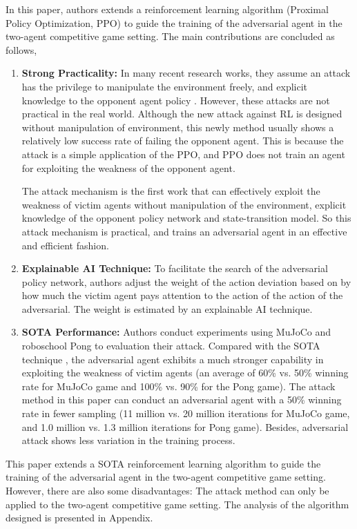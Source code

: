 \documentclass[a4paper]{article}
\begin{document}
In this paper, authors extends a reinforcement learning algorithm (Proximal Policy Optimization, PPO) to guide the training of the adversarial agent in the two-agent competitive game setting.
The main contributions are concluded as follows,
\begin{enumerate}
    \item \textbf{Strong Practicality:} In many recent research works, they assume an attack has the privilege to manipulate the environment freely, and explicit knowledge to the opponent agent policy \cite{xiao2019characterizing}. 
    However, these attacks are not practical in the real world. Although the new attack against RL is designed without manipulation of environment\cite{vinyals2019grandmaster}, 
    this newly method usually shows a relatively low success rate of failing the opponent agent. This is because the attack is a simple application of the PPO, and PPO does not train an agent for exploiting the weakness of the opponent agent.
    
    The attack mechanism is the first work that can effectively exploit the weakness of victim agents without manipulation of the environment, explicit knowledge of the opponent policy network and state-transition model.
    So this attack mechanism is practical, and trains an adversarial agent in an effective and efficient fashion. 
    \item \textbf{Explainable AI Technique:} To facilitate the search of the adversarial policy network, 
    authors adjust the weight of the action deviation based on by how much the victim agent pays attention to the action of the action of the adversarial.
    The weight is estimated by an explainable AI technique.
    \item \textbf{SOTA Performance:} Authors conduct experiments using MuJoCo and roboschool Pong to evaluation their attack. Compared with the SOTA technique \cite{gleave2019adversarial},
    the adversarial agent exhibits a much stronger capability in exploiting the weakness of victim agents (an average of 60\% vs. 50\% winning rate for
    MuJoCo game and 100\% vs. 90\% for the Pong game). The attack method in this paper can conduct an adversarial agent with a 50\% winning rate in fewer sampling (11 million vs. 20
    million iterations for MuJoCo game, and 1.0 million vs. 1.3 million iterations for Pong game).
    Besides, adversarial attack shows less variation in the training process.
\end{enumerate}

This paper extends a SOTA reinforcement learning algorithm to guide the training of the adversarial agent in the two-agent competitive game setting. However, there are also some disadvantages: 
The attack method can only be applied to the two-agent competitive game setting. The analysis of the algorithm designed is presented in Appendix.
\end{document}
